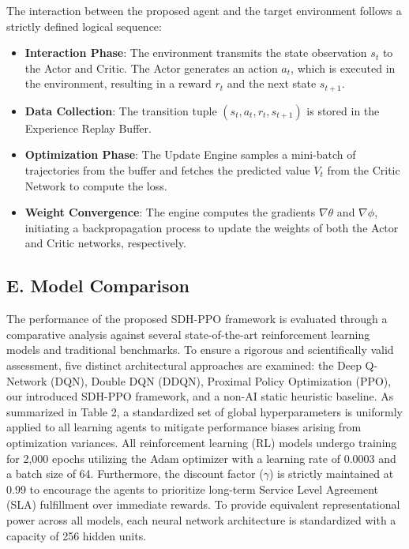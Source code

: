 The interaction between the proposed agent and the target environment follows a strictly defined logical sequence:

\begin{itemize}
\item
  \textbf{Interaction Phase}: The environment transmits the state observation \(s_{t}\) to the Actor and Critic. The Actor generates an action \(a_{t}\), which is executed in the environment, resulting in a reward \(r_{t}\) and the next state \(s_{t + 1}\).
\item
  \textbf{Data Collection}: The transition tuple \(\left( s_{t},a_{t},r_{t},s_{t + 1} \right)\) is stored in the Experience Replay Buffer.
\item
  \textbf{Optimization Phase}: The Update Engine samples a mini-batch of trajectories from the buffer and fetches the predicted value \(V_{t}\) from the Critic Network to compute the loss.
\item
  \textbf{Weight Convergence}: The engine computes the gradients \(\nabla\theta\) and \(\nabla\phi\), initiating a backpropagation process to update the weights of both the Actor and Critic networks, respectively.
\end{itemize}

\subsection{E. Model Comparison}\label{e.-model-comparison}

The performance of the proposed SDH-PPO framework is evaluated through a comparative analysis against several state-of-the-art reinforcement learning models and traditional benchmarks. To ensure a rigorous and scientifically valid assessment, five distinct architectural approaches are examined: the Deep Q-Network (DQN), Double DQN (DDQN), Proximal Policy Optimization (PPO), our introduced SDH-PPO framework, and a non-AI static heuristic baseline. As summarized in Table 2, a standardized set of global hyperparameters is uniformly applied to all learning agents to mitigate performance biases arising from optimization variances. All reinforcement learning (RL) models undergo training for 2,000 epochs utilizing the Adam optimizer with a learning rate of 0.0003 and a batch size of 64. Furthermore, the discount factor (\(\gamma\)) is strictly maintained at 0.99 to encourage the agents to prioritize long-term Service Level Agreement (SLA) fulfillment over immediate rewards. To provide equivalent representational power across all models, each neural network architecture is standardized with a capacity of 256 hidden units.

